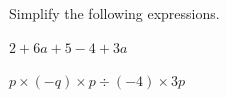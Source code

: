  Simplify the following expressions.

\begin{subparts}
  \item $2+6a+5-4+3a$
  \item $p\times(-q)\times p\div(-4)\times 3p$
\end{subparts}

